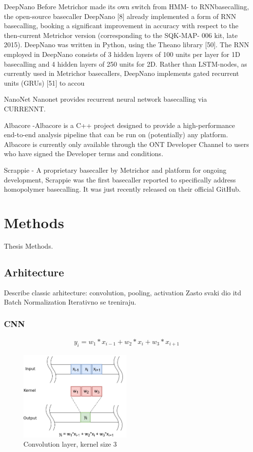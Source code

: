 \documentclass[times, utf8, diplomski, english]{fer}
\begin{document}
DeepNano Before Metrichor made its own switch from HMM- to RNNbasecalling,
the open-source basecaller DeepNano [8] already implemented a
form of RNN basecalling, booking a significant improvement in accuracy with
respect to the then-current Metrichor version (corresponding to the SQK-MAP-
006 kit, late 2015).
 DeepNano was written in Python, using the Theano library
[50]. The RNN employed in DeepNano consists of 3 hidden layers of 100 units per
layer for 1D basecalling and 4 hidden layers of 250 units for 2D. Rather than
LSTM-nodes, as currently used in Metrichor basecallers, DeepNano implements
gated recurrent units (GRUs) [51] to accou


NanoNet Nanonet provides recurrent neural network basecalling via CURRENNT.

Albacore -Albacore is a C++ project designed to provide a high-performance end-to-end analysis pipeline that can be run on (potentially) any platform. Albacore is currently only available through the ONT Developer Channel to users who have signed the Developer terms and conditions. 

Scrappie - A proprietary basecaller by Metrichor and platform for ongoing
development, Scrappie was the first basecaller reported to specifically address
homopolymer basecalling. It was just recently released on their official GitHub.



\chapter{Methods}
Thesis Methods.
\section{Arhitecture}
Describe classic arhitecture: convolution, pooling, activation
Zasto svaki dio itd
Batch Normalization 
Iterativno se treniraju.
\subsection{CNN}

\begin{gather*}
y_i = w_1 * x_{i-1} + w_2 * x_{i} + w_3 * x_{i+1}
\end{gather*}
\begin{figure}[!ht]
	\begin{center}
		\includegraphics[width=0.5\textwidth]{./imgs/convolution.png}
		\caption{Convolution layer, kernel size 3}
		\label{fg:convolution}
	\end{center}
\end{figure}
\end{document}
